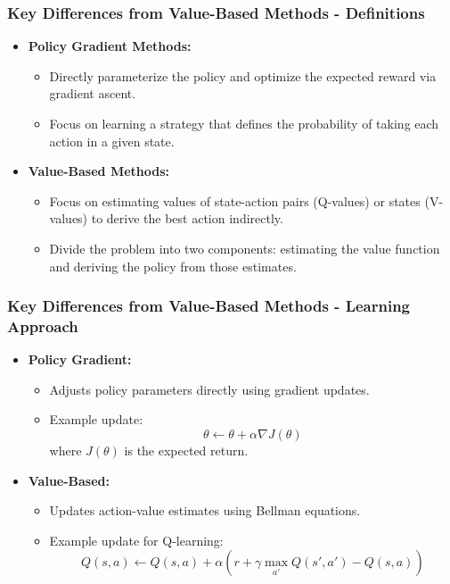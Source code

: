 \documentclass{beamer}
\begin{document}
\begin{frame}[fragile]
    \frametitle{Key Differences from Value-Based Methods - Definitions}
    \begin{itemize}
        \item \textbf{Policy Gradient Methods:}
        \begin{itemize}
            \item Directly parameterize the policy and optimize the expected reward via gradient ascent.
            \item Focus on learning a strategy that defines the probability of taking each action in a given state.
        \end{itemize}
        
        \item \textbf{Value-Based Methods:}
        \begin{itemize}
            \item Focus on estimating values of state-action pairs (Q-values) or states (V-values) to derive the best action indirectly.
            \item Divide the problem into two components: estimating the value function and deriving the policy from those estimates.
        \end{itemize}
    \end{itemize}
\end{frame}

\begin{frame}[fragile]
    \frametitle{Key Differences from Value-Based Methods - Learning Approach}
    \begin{itemize}
        \item \textbf{Policy Gradient:}
        \begin{itemize}
            \item Adjusts policy parameters directly using gradient updates.
            \item Example update:
            \begin{equation}
            \theta \leftarrow \theta + \alpha \nabla J(\theta)
            \end{equation}
            where \( J(\theta) \) is the expected return.
        \end{itemize}

        \item \textbf{Value-Based:}
        \begin{itemize}
            \item Updates action-value estimates using Bellman equations.
            \item Example update for Q-learning:
            \begin{equation}
            Q(s, a) \leftarrow Q(s, a) + \alpha \left( r + \gamma \max_{a'} Q(s', a') - Q(s, a) \right)
            \end{equation}
        \end{itemize}
    \end{itemize}
\end{frame}
\end{document}
